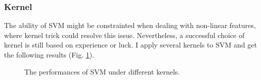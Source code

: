 \documentclass[12pt,a4paper]{article}
\theoremstyle{definition}
\begin{document}
\subsubsection{Kernel}

The ability of SVM might be constrainted when dealing with non-linear features, where kernel trick could resolve this issue. Nevertheless, a successful choice of kernel is still based on experience or luck. I apply several kernels to SVM and get the following results (Fig. \ref{fig:svm-kernel}).

\begin{figure}[H]
	\centering
	\caption{The performances of SVM under different kernels.}
	\label{fig:svm-kernel}
\end{figure}
\end{document}
